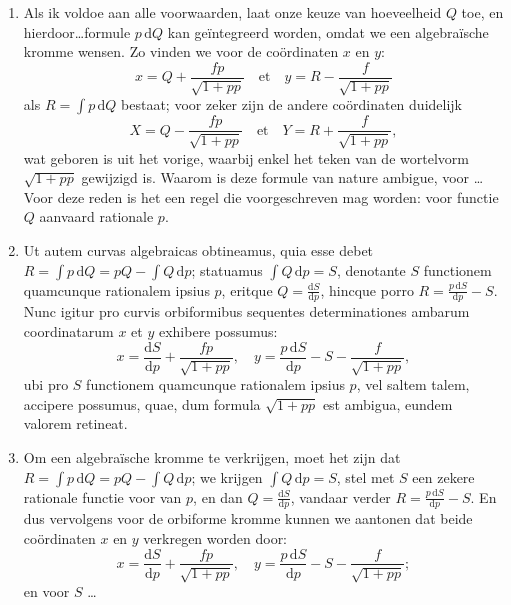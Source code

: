 \documentclass[10pt,a4paper]{article}
\newcommand{\switchenum}{\setcounter{enumi}{\arabic{enumi}-1}\switchcolumn}
\def\D{\mathrm{d}}
\begin{document}
\begin{paracol}{2}
\begin{enumerate}[topsep=1px]
		\switchenum
		\item Als ik voldoe aan alle voorwaarden, laat onze keuze van hoeveelheid $Q$ toe, en hierdoor\ldots formule $p\,\D Q$ kan geïntegreerd worden, omdat we een algebraïsche kromme wensen. Zo vinden we voor de coördinaten $x$ en $y$:
		\[
			x = Q + \frac{fp}{\sqrt{1+pp}} \quad\text{et}\quad y = R - \frac{f}{\sqrt{1+pp}}
		\]
		als $R=\int p \,\D Q$ bestaat; voor zeker zijn de andere coördinaten duidelijk
		\[
			X = Q- \frac{fp}{\sqrt{1+pp}} \quad \text{et} \quad Y = R + \frac{f}{\sqrt{1+pp}},		
		\]
		wat geboren is uit het vorige, waarbij enkel het teken van de wortelvorm $\sqrt{1+pp}$ gewijzigd is. Waarom is deze formule van nature ambigue, voor \ldots  Voor deze reden is het een regel die voorgeschreven mag worden: voor functie $Q$ aanvaard rationale $p$.
		
		
		\switchcolumn*
		
		\item Ut autem curvas algebraicas obtineamus, quia esse debet $R = \int p \,\D Q = pQ - \int Q \,\D p$; statuamus $\int Q \,\D p = S$, denotante $S$ functionem quamcunque rationalem ipsius $p$, eritque $Q = \frac{\D S}{\D p}$, hincque porro $R = \frac{p\,\D S}{\D p}-S$. Nunc igitur pro curvis orbiformibus sequentes determinationes ambarum coordinatarum $x$ et $y$ exhibere possumus:
		\[
			x = \frac{\D S}{\D p} + \frac{fp}{\sqrt{1+pp}}, \quad y = \frac{p\,\D S}{\D p} -S - \frac{f}{\sqrt{1+pp}},
		\]
		ubi pro $S$ functionem quamcunque rationalem ipsius $p$, vel saltem talem, accipere possumus, quae, dum formula $\sqrt{1+pp}$ est ambigua, eundem valorem retineat.
		
		\switchenum
		\item Om een algebraïsche kromme te verkrijgen, moet het zijn dat $R = \int p \,\D Q = pQ - \int Q \,\D p$; we krijgen  $\int Q \,\D p = S$, stel met $S$ een zekere rationale functie voor van $p$, en dan $Q = \frac{\D S}{\D p}$, vandaar verder $R = \frac{p\,\D S}{\D p}-S$. En dus vervolgens voor de orbiforme kromme kunnen we aantonen dat beide coördinaten $x$ en $y$ verkregen worden door: 
		\[
			x = \frac{\D S}{\D p} + \frac{fp}{\sqrt{1+pp}}, \quad y = \frac{p\,\D S}{\D p} -S - \frac{f}{\sqrt{1+pp}};
		\]
		en voor $S$ \ldots 
		
		\switchcolumn*
		

\end{enumerate}
\end{paracol}
\end{document}

